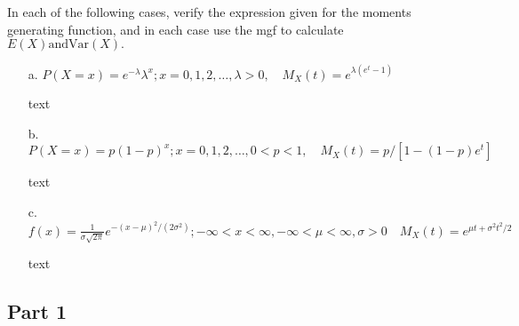 \documentclass{article}
\begin{document}
  In each of the following cases, verify the expression given for the moments generating function, and in each case use the mgf to calculate $E(X)  \textrm{and} \textrm{Var}(X).$
    \begin{enumerate}
    \item[a.]
      $P(X = x) = e^{-\lambda}\lambda^x;x=0,1,2,\dots,\lambda > 0, \quad M_X(t) = e^{\lambda(e^t-1)}$
    \item[]
      text
    \item[b.]
      $P(X = x) = p(1-p)^x;x=0,1,2,\dots,0 < p < 1, \quad M_X(t) = p/[1-(1-p)e^t]$
    \item[]
      text
    \item[c.]
      $f(x) = \frac{1}{\sigma\sqrt{2\pi}}e^{-(x-\mu)^2/(2\sigma^2)};-\infty < x< \infty,  -\infty < \mu < \infty, \sigma > 0 \quad M_X(t) = e^{\mu t + \sigma^2t^2/2}$
    \item[]
      text
    \end{enumerate}
    \clearpage


\subsection*{Part 1}
\end{document}
